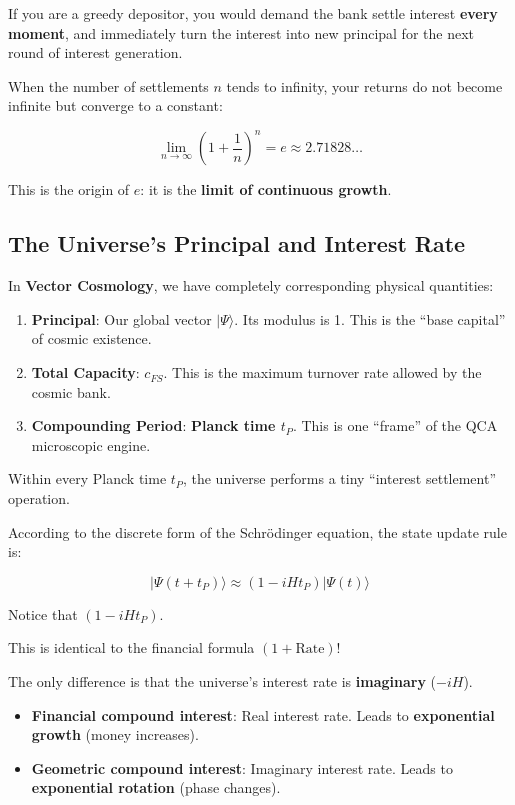 \documentclass[11pt,a4paper,twoside]{book}
\begin{document}
If you are a greedy depositor, you would demand the bank settle interest \textbf{every moment}, and immediately turn the interest into new principal for the next round of interest generation.

When the number of settlements $n$ tends to infinity, your returns do not become infinite but converge to a constant:

$$\lim_{n \to \infty} \left(1 + \frac{1}{n}\right)^n = e \approx 2.71828\ldots$$

This is the origin of \textbf{$e$}: it is the \textbf{limit of continuous growth}.

\subsection{The Universe's Principal and Interest Rate}

In \textbf{Vector Cosmology}, we have completely corresponding physical quantities:

\begin{enumerate}
\item \textbf{Principal}: Our global vector $|\Psi\rangle$. Its modulus is 1. This is the ``base capital'' of cosmic existence.

\item \textbf{Total Capacity}: $c_{FS}$. This is the maximum turnover rate allowed by the cosmic bank.

\item \textbf{Compounding Period}: \textbf{Planck time $t_P$}. This is one ``frame'' of the QCA microscopic engine.
\end{enumerate}

Within every Planck time $t_P$, the universe performs a tiny ``interest settlement'' operation.

According to the discrete form of the Schrödinger equation, the state update rule is:

$$|\Psi(t + t_P)\rangle \approx (1 - i H t_P) |\Psi(t)\rangle$$

Notice that $(1 - i H t_P)$.

This is identical to the financial formula $(1 + \text{Rate})$!

The only difference is that the universe's interest rate is \textbf{imaginary} ($-iH$).

\begin{itemize}
\item \textbf{Financial compound interest}: Real interest rate. Leads to \textbf{exponential growth} (money increases).

\item \textbf{Geometric compound interest}: Imaginary interest rate. Leads to \textbf{exponential rotation} (phase changes).
\end{itemize}
\end{document}

